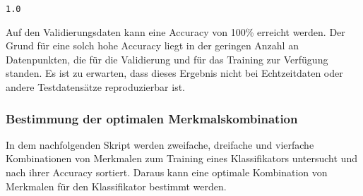 \documentclass[11pt]{article}
\makeatletter
\newcommand{\boxspacing}{\kern\kvtcb@left@rule\kern\kvtcb@boxsep}
\newcommand{\prompt}[4]{
        {\ttfamily\llap{{\color{#2}[#3]:\hspace{3pt}#4}}\vspace{-\baselineskip}}
    }
\makeatother
\begin{document}
            \begin{tcolorbox}[breakable, size=fbox, boxrule=.5pt, pad at break*=1mm, opacityfill=0]
\prompt{Out}{outcolor}{99}{\boxspacing}
\begin{Verbatim}[commandchars=\\\{\}]
1.0
\end{Verbatim}
\end{tcolorbox}
        
    Auf den Validierungsdaten kann eine Accuracy von 100\% erreicht werden.
Der Grund für eine solch hohe Accuracy liegt in der geringen Anzahl an
Datenpunkten, die für die Validierung und für das Training zur Verfügung
standen. Es ist zu erwarten, dass dieses Ergebnis nicht bei
Echtzeitdaten oder andere Testdatensätze reproduzierbar ist.

    \hypertarget{bestimmung-der-optimalen-merkmalskombination}{%
\subsubsection*{Bestimmung der optimalen
Merkmalskombination}\label{bestimmung-der-optimalen-merkmalskombination}}

    In dem nachfolgenden Skript werden zweifache, dreifache und vierfache
Kombinationen von Merkmalen zum Training eines Klassifikators untersucht
und nach ihrer Accuracy sortiert. Daraus kann eine optimale Kombination
von Merkmalen für den Klassifikator bestimmt werden.
\end{document}
